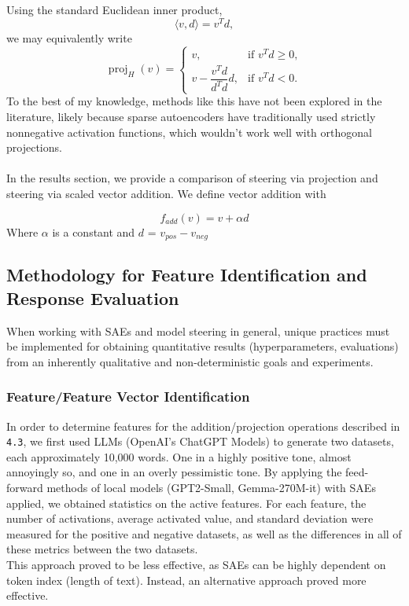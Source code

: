 \documentclass{article}
\begin{document}
Using the standard Euclidean inner product,
\[
\langle v,d\rangle = v^{T}d,
\]
we may equivalently write
\[
\operatorname{proj}_{H}(v)
=
\begin{cases}
v,
& \text{if } v^{T}d \ge 0, \\[8pt]
v - \dfrac{v^{T}d}{d^{T}d}d,
& \text{if } v^{T}d < 0.
\end{cases}
\]
To the best of my knowledge, methods like this have not been explored in the literature, likely because sparse autoencoders have traditionally used strictly nonnegative activation functions, which wouldn't work well with orthogonal projections.\\\\
In the results section, we provide a comparison of steering via projection and steering via scaled vector addition. We define vector addition with 

\[
    f_{add}(v) = v + \alpha d
\]
Where $\alpha$ is a constant and $d$ = $v_{pos} - v_{neg}$

\subsection{Methodology for Feature Identification and Response Evaluation}
When working with SAEs and model steering in general, unique practices must be implemented for obtaining quantitative results (hyperparameters, evaluations) from an inherently qualitative and non-deterministic goals and experiments.

\subsubsection{Feature/Feature Vector Identification}
In order to determine features for the addition/projection operations described in \texttt{4.3}, we first used LLMs (OpenAI's ChatGPT Models) to generate two datasets, each approximately 10,000 words. One in a highly positive tone, almost annoyingly so, and one in an overly pessimistic tone. By applying the feed-forward methods of local models (GPT2-Small, Gemma-270M-it) with SAEs applied, we obtained statistics on the active features. For each feature, the number of activations, average activated value, and standard deviation were measured for the positive and negative datasets, as well as the differences in all of these metrics between the two datasets.\\

This approach proved to be less effective, as SAEs can be highly dependent on token index (length of text). Instead, an alternative approach proved more effective.
\end{document}

